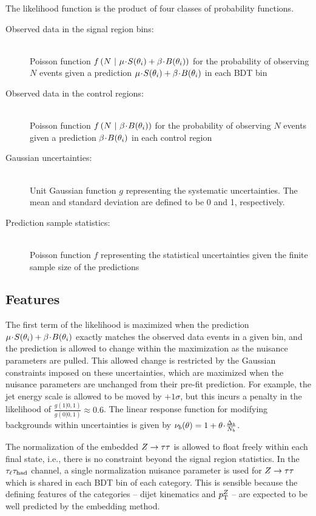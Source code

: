 The likelihood function is the product of four classes of probability functions.
%
\begin{description}
    \item[Observed data in the signal region bins:] \hfill \\
      Poisson function $f\left(N \ | \ \mu\!\cdot\! S(\theta_i) + \beta\!\cdot\! B(\theta_i)\right)$ for the probability of observing $N$ events given a prediction $\mu\!\cdot\! S(\theta_i) + \beta\!\cdot\! B(\theta_i)$ in each BDT bin

    \item[Observed data in the control regions:] \hfill \\
      Poisson function $f\left(N \ | \ \bkg\right)$ for the probability of observing $N$ events given a prediction $\beta\!\cdot\! B(\theta_i)$ in each control region

    \item[Gaussian uncertainties:] \hfill \\
      Unit Gaussian function $g$ representing the systematic uncertainties. The mean and standard deviation are defined to be 0 and 1, respectively.

    \item[Prediction sample statistics:] \hfill \\
      Poisson function $f$ representing the statistical uncertainties given the finite sample size of the predictions

\end{description}
%

\subsection{Features}

The first term of the likelihood is maximized when the prediction $\mu\!\cdot\! S(\theta_i) + \beta\!\cdot\! B(\theta_i)$ exactly matches the observed data events in a given bin, and the prediction is allowed to change within the maximization as the nuisance parameters are pulled. This allowed change is restricted by the Gaussian constraints imposed on these uncertainties, which are maximized when the nuisance parameters are unchanged from their pre-fit prediction. For example, the jet energy scale is allowed to be moved by $+1\sigma$, but this incurs a penalty in the likelihood of $\frac{g(1|0,1)}{g(0|0,1)}\approx 0.6$. The linear response function for modifying backgrounds within uncertainties is given by $\nu_b(\theta) = 1 + \theta\!\cdot\!\frac{\Delta_b}{N_b}$. 

The normalization of the embedded $Z\rightarrow\tau\tau$ is allowed to float freely within each final state, i.e., there is no constraint beyond the signal region statistics. In the $\tau_\ell\tau_\text{had}$ channel, a single normalization nuisance parameter is used for $Z\rightarrow\tau\tau$ which is shared in each BDT bin of each category. This is sensible because the defining features of the categories -- dijet kinematics and $p_{\mathrm{T}}^Z$ -- are expected to be well predicted by the embedding method.

